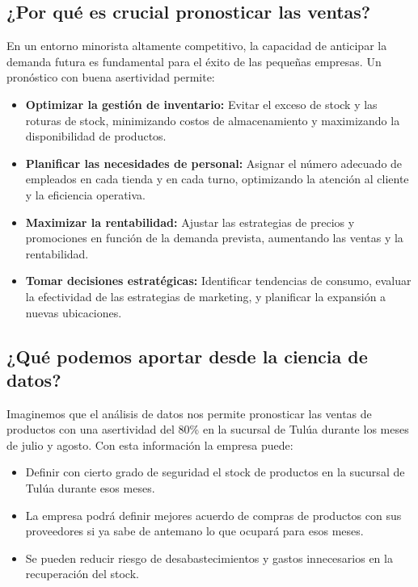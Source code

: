 \documentclass[
]{book}
\providecommand{\tightlist}{%
  \setlength{\itemsep}{0pt}\setlength{\parskip}{0pt}}
\begin{document}
\subsection{¿Por qué es crucial pronosticar las ventas?}\label{por-quuxe9-es-crucial-pronosticar-las-ventas}

En un entorno minorista altamente competitivo, la capacidad de anticipar la demanda futura es fundamental para el éxito de las pequeñas empresas. Un pronóstico con buena asertividad permite:

\begin{itemize}
\tightlist
\item
  \textbf{Optimizar la gestión de inventario:} Evitar el exceso de stock y las roturas de stock, minimizando costos de almacenamiento y maximizando la disponibilidad de productos.
\item
  \textbf{Planificar las necesidades de personal:} Asignar el número adecuado de empleados en cada tienda y en cada turno, optimizando la atención al cliente y la eficiencia operativa.
\item
  \textbf{Maximizar la rentabilidad:} Ajustar las estrategias de precios y promociones en función de la demanda prevista, aumentando las ventas y la rentabilidad.
\item
  \textbf{Tomar decisiones estratégicas:} Identificar tendencias de consumo, evaluar la efectividad de las estrategias de marketing, y planificar la expansión a nuevas ubicaciones.
\end{itemize}

\subsection{¿Qué podemos aportar desde la ciencia de datos?}\label{quuxe9-podemos-aportar-desde-la-ciencia-de-datos}

Imaginemos que el análisis de datos nos permite pronosticar las ventas de productos con una asertividad del 80\% en la sucursal de Tulúa durante los meses de julio y agosto. Con esta información la empresa puede:

\begin{itemize}
\tightlist
\item
  Definir con cierto grado de seguridad el stock de productos en la sucursal de Tulúa durante esos meses.
\item
  La empresa podrá definir mejores acuerdo de compras de productos con sus proveedores si ya sabe de antemano lo que ocupará para esos meses.
\item
  Se pueden reducir riesgo de desabastecimientos y gastos innecesarios en la recuperación del stock.
\end{itemize}
\end{document}
